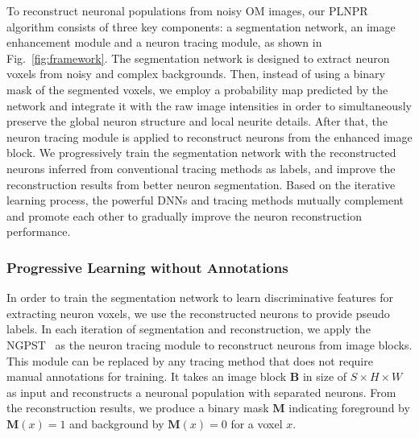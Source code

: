 To reconstruct neuronal populations from noisy OM images, our PLNPR algorithm consists of three key components: a segmentation network, an image enhancement module and a neuron tracing module, as shown in Fig.~\ref{fig:framework}. 
%
The segmentation network is designed to extract neuron voxels from noisy and complex backgrounds.
%
Then, instead of using a binary mask of the segmented voxels, we employ a probability map predicted by the network and integrate it with the raw image intensities in order to simultaneously preserve the global neuron structure and local neurite details.
After that, the neuron tracing module is applied to reconstruct neurons from the enhanced image block.
We progressively train the segmentation network with the reconstructed neurons inferred from conventional tracing methods as labels, and improve the reconstruction results from better neuron segmentation.
Based on the iterative learning process, the powerful DNNs and tracing methods mutually complement and promote each other to gradually improve the neuron reconstruction performance.


\subsubsection{Progressive Learning without Annotations}
\label{sec:PL}

In order to train the segmentation network to learn discriminative features for extracting neuron voxels, we use the reconstructed neurons to provide pseudo labels.
%
In each iteration of segmentation and reconstruction, we apply the NGPST~\cite{Quan2015} as the neuron tracing module to reconstruct neurons from image blocks. This module can be replaced by any tracing method that does not require manual annotations for training.
It takes an image block $\mathbf{B}$ in size of $S\times H \times W$ as input and reconstructs a neuronal population with separated neurons.
From the reconstruction results, we produce a binary mask $\mathbf{M}$ indicating foreground by $\mathbf{M}(x)=1$ and background by $\mathbf{M}(x)=0$ for a voxel $ x $.



